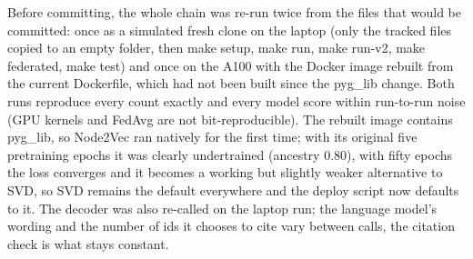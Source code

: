 \documentclass[11pt,a4paper]{article}
\begin{document}
Before committing, the whole chain was re-run twice from the files that would be committed: once as a simulated fresh clone on the laptop (only the tracked files copied to an empty folder, then make setup, make run, make run-v2, make federated, make test) and once on the A100 with the Docker image rebuilt from the current Dockerfile, which had not been built since the pyg\_lib change. Both runs reproduce every count exactly and every model score within run-to-run noise (GPU kernels and FedAvg are not bit-reproducible). The rebuilt image contains pyg\_lib, so Node2Vec ran natively for the first time; with its original five pretraining epochs it was clearly undertrained (ancestry 0.80), with fifty epochs the loss converges and it becomes a working but slightly weaker alternative to SVD, so SVD remains the default everywhere and the deploy script now defaults to it. The decoder was also re-called on the laptop run; the language model's wording and the number of ids it chooses to cite vary between calls, the citation check is what stays constant.
\end{document}
